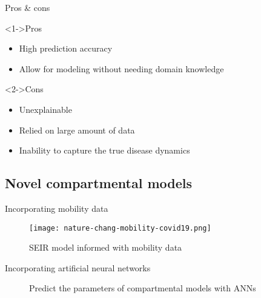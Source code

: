 \begin{frame}{Pros \& cons}
    \begin{exampleblock}<1->{Pros}
    \begin{itemize}
        \item High prediction accuracy
        \item Allow for modeling without needing domain knowledge
    \end{itemize}
    \end{exampleblock}

    \begin{alertblock}<2->{Cons}
    \begin{itemize}
        \item Unexplainable
        \item Relied on large amount of data
        \item Inability to capture the true disease dynamics
    \end{itemize}
    \end{alertblock}
\end{frame}

\subsection{Novel compartmental models}

\begin{frame}{Incorporating mobility data}
    \begin{figure}[!htb]
        \centering
        \texttt{[image: nature-chang-mobility-covid19.png]}
        \caption{\gls{SEIR} model informed with mobility data \cite{changMobilityNetworkModels2021}}
        \label{fig:nature-chang-mobility-covid19}
    \end{figure}
\end{frame}

\begin{frame}{Incorporating artificial neural networks}
    \begin{figure}[!htb]
        \centering
        \caption{Predict the parameters of compartmental models with \glspl{ANN}}
        \label{fig:compartmentals-models-with-neural-networks}
    \end{figure}
\end{frame}
